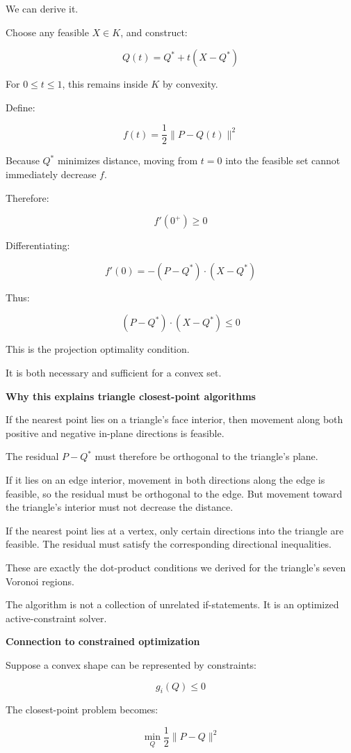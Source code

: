 We can derive it.

Choose any feasible \(X\in K\), and construct:

\[
Q(t)=Q^*+t(X-Q^*)
\]

For \(0\le t\le1\), this remains inside \(K\) by convexity.

Define:

\[
f(t)=\frac12\|P-Q(t)\|^2
\]

Because \(Q^*\) minimizes distance, moving from \(t=0\) into the feasible set cannot immediately decrease \(f\).

Therefore:

\[
f'(0^+)\ge0
\]

Differentiating:

\[
f'(0)=-(P-Q^*)\cdot(X-Q^*)
\]

Thus:

\[
(P-Q^*)\cdot(X-Q^*)\le0
\]

This is the projection optimality condition.

It is both necessary and sufficient for a convex set.

\textbf{Why this explains triangle closest-point algorithms}

If the nearest point lies on a triangle's face interior, then movement along both positive and negative in-plane directions is feasible.

The residual \(P-Q^*\) must therefore be orthogonal to the triangle's plane.

If it lies on an edge interior, movement in both directions along the edge is feasible, so the residual must be orthogonal to the edge. But movement toward the triangle's interior must not decrease the distance.

If the nearest point lies at a vertex, only certain directions into the triangle are feasible. The residual must satisfy the corresponding directional inequalities.

These are exactly the dot-product conditions we derived for the triangle's seven Voronoi regions.

The algorithm is not a collection of unrelated if-statements. It is an optimized active-constraint solver.

\textbf{Connection to constrained optimization}

Suppose a convex shape can be represented by constraints:

\[
g_i(Q)\le0
\]

The closest-point problem becomes:

\[
\min_Q \frac12\|P-Q\|^2
\]

